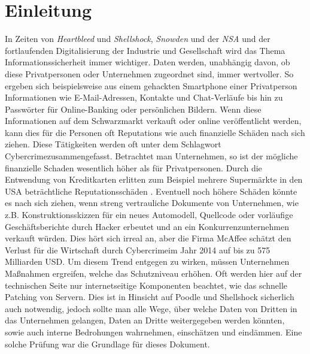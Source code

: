 \chapter{Einleitung}
In Zeiten von \textit{Heartbleed}\cite{Heartbleed} und  \textit{Shellshock}\cite{Shellshock}, \textit{Snowden} und der \textit{NSA}\cite{Snowden} und der fortlaufenden Digitalisierung der Industrie und Gesellschaft wird das Thema Informationssicherheit immer wichtiger. Daten werden, unabhängig davon, ob diese Privatpersonen oder Unternehmen zugeordnet sind, immer wertvoller. So ergeben sich beispielsweise aus einem gehackten Smartphone einer Privatperson Informationen wie E-Mail-Adressen, Kontakte und Chat-Verläufe bis hin zu Passwörter für Online-Banking oder persönlichen Bildern. Wenn diese Informationen auf dem Schwarzmarkt verkauft oder online veröffentlicht werden, kann dies für die Personen oft Reputations wie auch finanzielle Schäden nach sich ziehen. Diese Tätigkeiten werden oft unter dem Schlagwort \glqq Cybercrime\grqq zusammengefasst. Betrachtet man Unternehmen, so ist der mögliche finanzielle Schaden wesentlich höher als für Privatpersonen. Durch die Entwendung von Kreditkarten erlitten zum Beispiel mehrere Supermärkte in den USA beträchtliche Reputationsschäden \cite{HackKreditkarten}\cite{HackKreditkarten2}. Eventuell noch höhere Schäden könnte es nach sich ziehen, wenn streng vertrauliche Dokumente von Unternehmen, wie z.B. Konstruktionsskizzen für ein neues Automodell, Quellcode oder vorläufige Geschäftsberichte durch Hacker erbeutet und an ein Konkurrenzunternehmen verkauft würden. Dies hört sich irreal an, aber die Firma McAffee schätzt den Verlust für die Wirtschaft durch \glqq Cybercrime\grqq im Jahr 2014 auf bis zu 575 Milliarden USD\cite{McAffee}. 
Um diesem Trend entgegen zu wirken, müssen Unternehmen Maßnahmen ergreifen, welche das Schutzniveau erhöhen. Oft werden hier auf der technischen Seite nur internetseitige Komponenten beachtet, wie das schnelle Patching von Servern. Dies ist in Hinsicht auf  Poodle und Shellshock sicherlich auch notwendig, jedoch sollte man alle Wege, über welche Daten von Dritten in das Unternehmen gelangen, Daten an Dritte weitergegeben werden könnten, sowie auch interne Bedrohungen wahrnehmen, einschätzen und eindämmen. Eine solche Prüfung war die Grundlage für dieses Dokument.